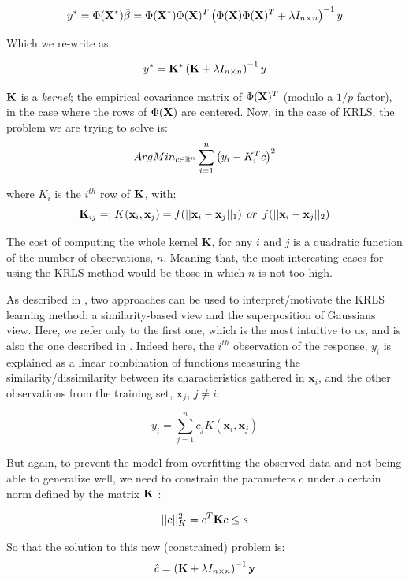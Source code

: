$$
y^* = \Phi({\bf X^*})\hat{\beta} = \Phi({\bf X^*})\Phi({\bf X})^T \left( \Phi({\bf X})\Phi({\bf X})^T + \lambda I_{n \times n} \right)^{-1} y
$$

Which we re-write as:

$$
y^* =  {\bf K^*} \left( {\bf K} + \lambda I_{n \times n} \right)^{-1} y
$$

${\bf K}$ is a {\it kernel}; the empirical covariance matrix of $\Phi({\bf X})^T$ (modulo a $1/p$ factor), in the case where the rows of $\Phi({\bf X})$ are centered. Now, in the case of KRLS, the problem we are trying to solve is:
$$
ArgMin_{c \in \mathbb{R}^n} \sum_{i = 1}^n \left( y_i - K_i^T c \right)^2
$$

where $K_i$ is the $i^{th}$ row of ${\bf K}$, with:
$$
{\bf K}_{ij} =: K(\textbf{x}_i, \textbf{x}_j) = f(||\textbf{x}_i - \textbf{x}_j||_1) \: \: or \: \: f(||\textbf{x}_i - \textbf{x}_j||_2)
$$

The cost of computing the whole kernel {\bf K}, for any $i$ and $j$ is a quadratic function of the number of observations, $n$. Meaning that, the most interesting cases for using the KRLS method would be those in which $n$ is not too high.

As described in \cite{jens2014kernel}, two approaches can be used to interpret/motivate the KRLS learning method: a similarity-based view and the superposition of Gaussians view. Here, we refer only to the first one, which is the most intuitive to us, and is also the one described in \cite{ferwerda2017kernel}. Indeed here, the $i^{th}$ observation of the response, $y_i$ is explained as a linear combination of functions measuring the similarity/dissimilarity between its characteristics gathered in $\textbf{x}_i$, and the other observations from the training set, $\textbf{x}_j$, $j \neq i$:

\begin{equation}
\label{eq:comblinresponse}
y_i = \sum_{j = 1}^n c_j K(\textbf{x}_i, \textbf{x}_j)
\end{equation}

But again, to prevent the model from overfitting the observed data and not being able to generalize well, we need to constrain the parameters $c$ under a certain norm defined by the matrix ${\bf K}$ \cite{hofmann2008kernel}:

$$
||c||^2_K = c^T {\bf K}  c  \leq s
$$

So that the solution to this new (constrained) problem is:
$$
\hat{c} = \left( {\bf K}  + \lambda I_{n \times n} \right)^{-1}{\bf y}\\
$$

